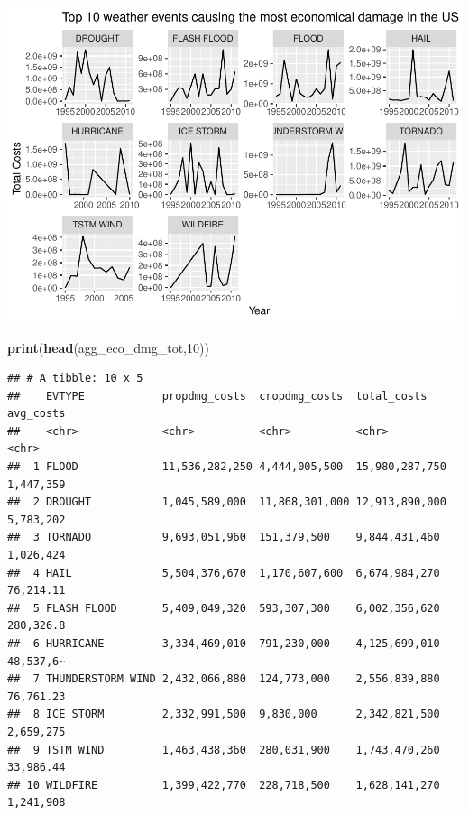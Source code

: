 \documentclass[]{article}
\newenvironment{Shaded}{\begin{snugshade}}{\end{snugshade}}
\newcommand{\KeywordTok}[1]{\textcolor[rgb]{0.13,0.29,0.53}{\textbf{#1}}}
\newcommand{\DecValTok}[1]{\textcolor[rgb]{0.00,0.00,0.81}{#1}}
\newcommand{\NormalTok}[1]{#1}
\begin{document}
\includegraphics{Reproducible_research_-_week_4_-_NOAA_storm_data_analysis_files/figure-latex/top 10 events economical damage-1.pdf}

\begin{Shaded}
\begin{Highlighting}[]
\KeywordTok{print}\NormalTok{(}\KeywordTok{head}\NormalTok{(agg_eco_dmg_tot,}\DecValTok{10}\NormalTok{))}
\end{Highlighting}
\end{Shaded}

\begin{verbatim}
## # A tibble: 10 x 5
##    EVTYPE            propdmg_costs  cropdmg_costs  total_costs    avg_costs
##    <chr>             <chr>          <chr>          <chr>          <chr>    
##  1 FLOOD             11,536,282,250 4,444,005,500  15,980,287,750 1,447,359
##  2 DROUGHT           1,045,589,000  11,868,301,000 12,913,890,000 5,783,202
##  3 TORNADO           9,693,051,960  151,379,500    9,844,431,460  1,026,424
##  4 HAIL              5,504,376,670  1,170,607,600  6,674,984,270  76,214.11
##  5 FLASH FLOOD       5,409,049,320  593,307,300    6,002,356,620  280,326.8
##  6 HURRICANE         3,334,469,010  791,230,000    4,125,699,010  48,537,6~
##  7 THUNDERSTORM WIND 2,432,066,880  124,773,000    2,556,839,880  76,761.23
##  8 ICE STORM         2,332,991,500  9,830,000      2,342,821,500  2,659,275
##  9 TSTM WIND         1,463,438,360  280,031,900    1,743,470,260  33,986.44
## 10 WILDFIRE          1,399,422,770  228,718,500    1,628,141,270  1,241,908
\end{verbatim}
\end{document}
